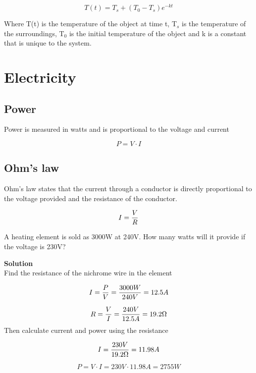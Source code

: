 \documentclass[11pt,fleqn,openany]{book} %
\begin{document}
\begin{equation}
T(t) = T_s + (T_0 - T_s) e^{-kt}
\end{equation}

Where T(t) is the temperature of the object at time t, T$_s$ is the temperature of the surroundings, T$_0$ is the initial temperature of the object and k is a constant that is unique to the system.

\section{Electricity}

\subsection{Power}

Power is measured in watts and is proportional to the voltage and current

\begin{equation}
P = V \cdot I
\end{equation}

\subsection{Ohm's law}

Ohm's law states that the current through a conductor is directly proportional to the voltage provided and the resistance of the conductor.

\begin{equation}
I = {V \over R}
\end{equation}

\begin{exercise}
A heating element is sold as 3000W at 240V. How many watts will it provide if the voltage is 230V?

\textbf{Solution}\\
Find the resistance of the nichrome wire in the element

\begin{equation*}
I = {P \over V} = {3000W \over 240V} = 12.5A
\end{equation*}

\begin{equation*}
R = {V \over I} = {240V \over 12.5A} = 19.2 \Omega
\end{equation*}
Then calculate current and power using the resistance

\begin{equation*}
I = {230V \over 19.2 \Omega} = 11.98A
\end{equation*}

\begin{equation*}
P = V \cdot I = 230V \cdot 11.98A = 2755W
\end{equation*}

\end{exercise}
\end{document}
